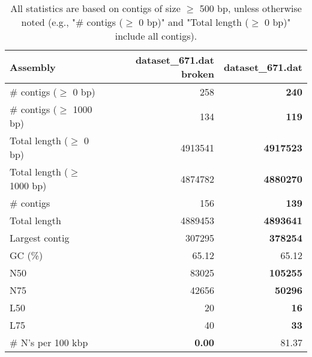 \documentclass[12pt,a4paper]{article}
\begin{document}
\begin{table}[ht]
\begin{center}
\caption{All statistics are based on contigs of size $\geq$ 500 bp, unless otherwise noted (e.g., "\# contigs ($\geq$ 0 bp)" and "Total length ($\geq$ 0 bp)" include all contigs).}
\begin{tabular}{|l*{2}{|r}|}
\hline
Assembly & dataset\_671.dat broken & dataset\_671.dat \\ \hline
\# contigs ($\geq$ 0 bp) & 258 & {\bf 240} \\ \hline
\# contigs ($\geq$ 1000 bp) & 134 & {\bf 119} \\ \hline
Total length ($\geq$ 0 bp) & 4913541 & {\bf 4917523} \\ \hline
Total length ($\geq$ 1000 bp) & 4874782 & {\bf 4880270} \\ \hline
\# contigs & 156 & {\bf 139} \\ \hline
Total length & 4889453 & {\bf 4893641} \\ \hline
Largest contig & 307295 & {\bf 378254} \\ \hline
GC (\%) & 65.12 & 65.12 \\ \hline
N50 & 83025 & {\bf 105255} \\ \hline
N75 & 42656 & {\bf 50296} \\ \hline
L50 & 20 & {\bf 16} \\ \hline
L75 & 40 & {\bf 33} \\ \hline
\# N's per 100 kbp & {\bf 0.00} & 81.37 \\ \hline
\end{tabular}
\end{center}
\end{table}
\end{document}
